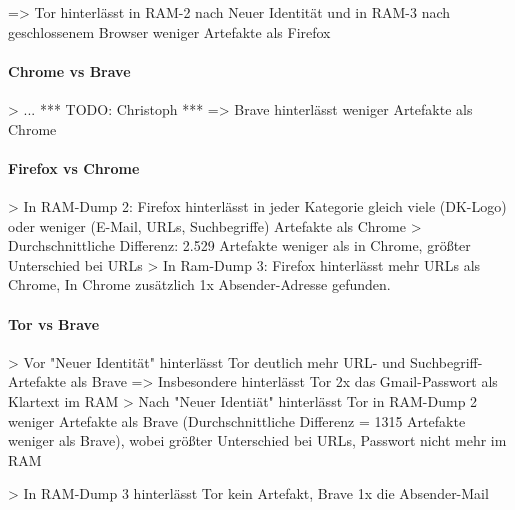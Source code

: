 => Tor hinterlässt in RAM-2 nach Neuer Identität und in RAM-3 nach geschlossenem Browser weniger Artefakte als Firefox

\paragraph*{Chrome vs Brave}
> ... *** TODO: Christoph ***
=> Brave hinterlässt weniger Artefakte als Chrome

\paragraph*{Firefox vs Chrome}
> In RAM-Dump 2: Firefox hinterlässt in jeder Kategorie gleich viele (DK-Logo) oder weniger (E-Mail, URLs, Suchbegriffe) Artefakte als Chrome
> Durchschnittliche Differenz: 2.529 Artefakte weniger als in Chrome, größter Unterschied bei URLs
> In Ram-Dump 3: Firefox hinterlässt mehr URLs als Chrome, In Chrome zusätzlich 1x Absender-Adresse gefunden.

\paragraph*{Tor vs Brave}
> Vor "Neuer Identität" hinterlässt Tor deutlich mehr URL- und Suchbegriff-Artefakte als Brave
	=> Insbesondere hinterlässt Tor 2x das Gmail-Passwort als Klartext im RAM
> Nach "Neuer Identiät" hinterlässt Tor in RAM-Dump 2 weniger Artefakte als Brave (Durchschnittliche Differenz = 1315 Artefakte weniger als Brave), wobei größter Unterschied bei URLs, Passwort nicht mehr im RAM

> In RAM-Dump 3 hinterlässt Tor kein Artefakt, Brave 1x die Absender-Mail
















